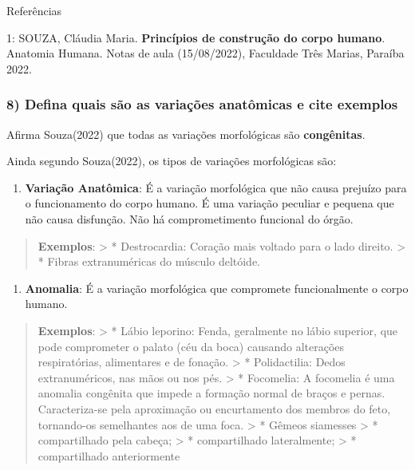 \documentclass[
]{book}
\providecommand{\tightlist}{%
  \setlength{\itemsep}{0pt}\setlength{\parskip}{0pt}}
\begin{document}
Referências

1: SOUZA, Cláudia Maria. \textbf{Princípios de construção do corpo humano}. Anatomia Humana. Notas de aula (15/08/2022), Faculdade Três Marias, Paraíba 2022.

\hypertarget{defina-quais-suxe3o-as-variauxe7uxf5es-anatuxf4micas-e-cite-exemplos}{%
\subsubsection*{8) Defina quais são as variações anatômicas e cite exemplos}\label{defina-quais-suxe3o-as-variauxe7uxf5es-anatuxf4micas-e-cite-exemplos}}

Afirma Souza(2022) que todas as variações morfológicas são \textbf{congênitas}.

Ainda segundo Souza(2022), os tipos de variações morfológicas são:

\begin{enumerate}
\def\labelenumi{\arabic{enumi}.}
\tightlist
\item
  \textbf{Variação Anatômica}: É a variação morfológica que não causa prejuízo para o funcionamento do corpo humano. É uma variação peculiar e pequena que não causa disfunção. Não há comprometimento funcional do órgão.
\end{enumerate}

\begin{quote}
\textbf{Exemplos}:
\textgreater{} * Destrocardia: Coração mais voltado para o lado direito.
\textgreater{} * Fibras extranuméricas do músculo deltóide.
\end{quote}

\begin{enumerate}
\def\labelenumi{\arabic{enumi}.}
\setcounter{enumi}{1}
\tightlist
\item
  \textbf{Anomalia}: É a variação morfológica que compromete funcionalmente o corpo humano.
\end{enumerate}

\begin{quote}
\textbf{Exemplos}:
\textgreater{} * Lábio leporino: Fenda, geralmente no lábio superior, que pode comprometer o palato (céu da boca) causando alterações respiratórias, alimentares e de fonação.
\textgreater{} * Polidactilia: Dedos extranuméricos, nas mãos ou nos pés.
\textgreater{} * Focomelia: A focomelia é uma anomalia congênita que impede a formação normal de braços e pernas. Caracteriza-se pela aproximação ou encurtamento dos membros do feto, tornando-os semelhantes aos de uma foca.
\textgreater{} * Gêmeos siamesses
\textgreater{} * compartilhado pela cabeça;
\textgreater{} * compartilhado lateralmente;
\textgreater{} * compartilhado anteriormente
\end{quote}
\end{document}
